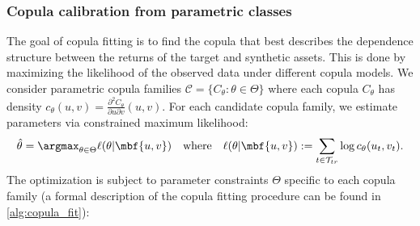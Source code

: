 \subsubsection{Copula calibration from parametric classes}

The goal of copula fitting is to find the copula that best describes the dependence structure between the returns of the target and synthetic assets. This is done by maximizing the likelihood of the observed data under different copula models. 
We consider parametric copula families $\mathcal{C} = \{C_\theta : \theta \in \Theta\}$ where each copula $C_\theta$ has density
$
c_\theta(u,v) = \frac{\partial^2 C_\theta}{\partial u \partial v}(u,v)
.
$
For each candidate copula family, we estimate parameters via constrained maximum likelihood:
%
\begin{equation} \label{eq:mle}
\hat{\theta} = \argmax_{\theta \in \Theta} \ell(\theta | \mbf {u,v}) \quad \text{where} \quad 
\ell(\theta| \mbf {u,v}) := \sum_{t\in\mathcal T_{tr}} \log c_\theta(u_t, v_t)
.
\end{equation}
%
The optimization is subject to parameter constraints $\Theta$ specific to each copula family (a formal description of the copula fitting procedure can be found in \cref{alg:copula_fit}):

